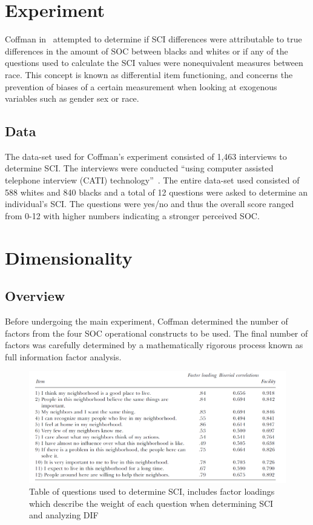 \documentclass{sig-alternate}
\begin{document}
\section{Experiment}
\label{sec:experiment}
Coffman in~\cite{disparities:2009} attempted to determine if SCI differences were attributable to true differences in the amount of SOC between blacks and whites or if any of the questions used to calculate the SCI values were nonequivalent measures between race. This concept is known as differential item functioning, and concerns the prevention of biases of a certain measurement when looking at exogenous variables such as gender sex or race. 

\subsection{Data}
The data-set used for Coffman's experiment consisted of 1,463 interviews to determine SCI. The interviews were conducted ``using computer assisted telephone interview (CATI) technology''~\cite{disparities:2009}. The entire data-set used consisted of 588 whites and 840 blacks and a total of 12 questions were asked to determine an individual's SCI. The questions were yes/no and thus the overall score ranged from 0-12 with higher numbers indicating a stronger perceived SOC. 

\section{Dimensionality}
\label{sec:dimensionality}
\subsection{Overview}
Before undergoing the main experiment, Coffman determined the number of factors from the four SOC operational constructs to be used. The final number of factors was carefully determined by a mathematically rigorous process known as full information factor analysis. 
\begin{figure}
\centering
\label{fig:questions}
\includegraphics[scale=0.5]{Images/questions.png}
\caption{Table of questions used to determine SCI, includes factor loadings which describe the weight of each question when determining SCI and analyzing DIF~\cite{disparities:2009}}
\end{figure}
\end{document}
